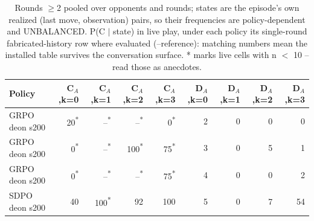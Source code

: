 \begin{table}[t]
\centering
\caption{Rounds $\geq$2 pooled over opponents and rounds; states are the episode's own realized (last move, observation) pairs, so their frequencies are policy-dependent and UNBALANCED. P(C $\mid$ state) in live play, under each policy its single-round fabricated-history row where evaluated (--reference): matching numbers mean the installed table survives the conversation surface. * marks live cells with n $<$ 10 -- read those as anecdotes.}
\label{tab:mr-live-states}
\small
\setlength{\tabcolsep}{3.5pt}
\begin{tabular}{lrrrrrrrr}
\toprule
Policy & C$_A$,k=0 & C$_A$,k=1 & C$_A$,k=2 & C$_A$,k=3 & D$_A$,k=0 & D$_A$,k=1 & D$_A$,k=2 & D$_A$,k=3 \\
\midrule
GRPO deon s200 & 20\textsuperscript{*} & --\textsuperscript{*} & --\textsuperscript{*} & 0\textsuperscript{*} & 2 & 0 & 0 & 0 \\
GRPO deon s200 & 0\textsuperscript{*} & --\textsuperscript{*} & 100\textsuperscript{*} & 75\textsuperscript{*} & 3 & 0 & 5 & 1 \\
GRPO deon s200 & 0\textsuperscript{*} & --\textsuperscript{*} & --\textsuperscript{*} & 75\textsuperscript{*} & 4 & 0 & 0 & 2 \\
SDPO deon s200 & 40 & 100\textsuperscript{*} & 92 & 100 & 5 & 0 & 7 & 54 \\
\bottomrule
\end{tabular}
\end{table}
